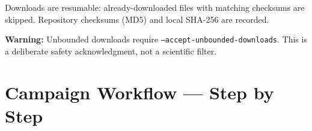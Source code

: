 \documentclass[11pt,a4paper]{article}
\begin{document}
Downloads are resumable: already-downloaded files with matching checksums are skipped. Repository checksums (MD5) and local SHA-256 are recorded.

\bigskip
\begin{warnbox}
\textbf{Warning:} Unbounded downloads require \texttt{--accept-unbounded-downloads}. This is a deliberate safety acknowledgment, not a scientific filter.
\end{warnbox}

\section{Campaign Workflow --- Step by Step}
\end{document}

